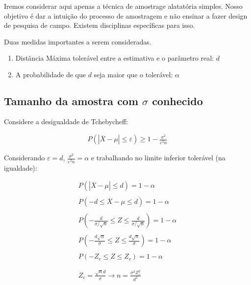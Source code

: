\documentclass[
  letterpaper,
  DIV=11,
  numbers=noendperiod]{scrartcl}
\begin{document}
Iremos considerar aqui apenas a técnica de amostrage alatatória simples.
Nosso objetivo é dar a intuição do processo de amostragem e não ensinar
a fazer design de pesquisa de campo. Existem disciplinas específicas
para isso.

Duas medidas importantes a serem consideradas.

\begin{enumerate}
  \item Distância Máxima tolerável entre a estimativa e o parâmetro real: $d$
   \item A probabilidade de que $d$ seja maior que o tolerável: $\alpha$
\end{enumerate}

\subsection{\texorpdfstring{Tamanho da amostra com \(\sigma\)
conhecido}{Tamanho da amostra com \textbackslash sigma conhecido}}\label{tamanho-da-amostra-com-sigma-conhecido}

Considere a desigualdade de Tchebycheff:

\[\begin{array}{ccc}
P(|\overline{X} - \mu| \leq \varepsilon ) \geq 1-\frac{\sigma^{2}}{\varepsilon^{2} n}
\end{array}\]

\hfill\break

Considerando \(\varepsilon=d\),
\(\frac{\sigma^{2}}{\varepsilon^{2} n}=\alpha\) e trabalhando no limite
inferior tolerável (na igualdade):

\[\begin{array}{ccc}
P(|\overline{X} - \mu|\leq d) = 1 - \alpha
\\
\\
P(-d \leq \overline{X} - \mu\leq d) = 1 - \alpha
\\
\\
P(-\frac{d}{\sigma/\sqrt{n} } \leq Z \leq \frac{d}{\sigma/\sqrt{n}}) = 1 - \alpha
\\
\\
P(-\frac{d\sqrt{n}}{\sigma } \leq Z \leq \frac{d\sqrt{n}}{\sigma}) = 1 - \alpha
\\
\\
P(-Z_c \leq Z \leq Z_c) = 1 - \alpha
\\
\\
\\
Z_c=\frac{\sqrt{n}d}{\sigma} \rightarrow n=\frac{\sigma^{2}Z_c^{2}}{d^{2}} 
\end{array}\]
\end{document}
